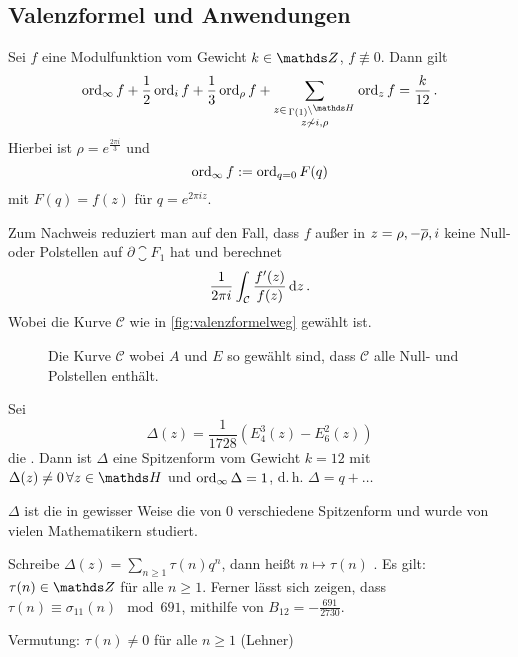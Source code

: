 \subsection{Valenzformel und Anwendungen}

\begin{satz}[Valenzformel]
	Sei $f$ eine Modulfunktion vom Gewicht $k \in \ZZ$, $f \not \equiv 0$. Dann gilt
	\[
	\ord_\infty f + \frac 12 \ord_i f + \frac 13 \ord_\rho f + \sum_{\substack{z \in \linksmodulo{\Gamma(1)}{\HH} \\ z \not \sim i, \rho}} \ord_z f = \frac {k}{12}
	\,.
	\]
	Hierbei ist $\rho = e^{\frac{2 \pi i}{3}}$ und
	\[
	\operatorname{ord}_\infty f := \operatorname{ord}_{q = 0} F(q)
	\]
	mit $F(q) = f(z)$ für $q = e^{2\pi i z}$.
\end{satz}

\begin{bewe}
	Zum Nachweis reduziert man auf den Fall, dass $f$ außer in $z = \rho, - \overline{\rho}, i$ keine Null- oder Polstellen auf $\partial \closure{F_1}$ hat und berechnet
	\[
	\frac{1}{2\pi i} \int_{\mathcal C} \frac{f'(z)}{f(z)} \,\mathrm{d} z
	\,.
	\]
	Wobei die Kurve $\mathcal C$ wie in \autoref{fig:valenzformelweg} gewählt ist.
	
	\begin{figure}
		\begin{center}
			
			\caption{Die Kurve $\mathcal C$ wobei $A$ und $E$ so gewählt sind, dass $\mathcal C$ alle Null- und Polstellen enthält.}
			\label{fig:valenzformelweg}
		\end{center}
	\end{figure}
\end{bewe}

\begin{defi}
	Sei
	\[
	\Delta (z) = \frac{1}{1728} \left( E_4^3(z) - E_6^2(z) \right)
	\]
	die . Dann ist $\Delta$ eine Spitzenform vom Gewicht $k = 12$ mit $\Delta(z) \neq 0 \, \forall z \in \HH$ und $\operatorname{ord}_\infty \Delta = 1$, d.\,h. $\Delta = q + \ldots$
\end{defi}

\begin{beme}
	$\Delta$ ist die in gewisser Weise die  von 0 verschiedene Spitzenform und wurde von vielen Mathematikern studiert.
	
	\begin{bsp-list}
		\item Schreibe $\Delta(z) = \sum_{n \geq 1} \tau (n) q^n$, dann heißt $n \mapsto \tau (n)$ . Es gilt: $\tau (n) \in \ZZ$ für alle $n \geq 1$. Ferner lässt sich zeigen, dass $\tau (n) \equiv \sigma_{11}(n) \mod 691$, mithilfe von $B_{12} = - \frac{691}{2730}$.
		\item Vermutung: $\tau (n) \neq 0$ für alle $n \geq 1$ (Lehner)
	\end{bsp-list}
	
\end{beme}


